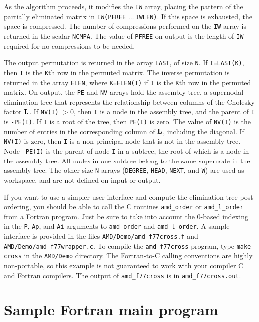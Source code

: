 \documentclass[11pt]{article}
\newcommand{\m}[1]{{\bf{#1}}}       %
\begin{document}
As the algorithm proceeds, it modifies the {\tt IW} array, placing the
pattern of the partially eliminated matrix in
{\tt IW(PFREE} $\ldots \:${\tt IWLEN)}.
If this space is exhausted, the space is compressed.
The number of compressions performed on the {\tt IW} array is
returned in the scalar {\tt NCMPA}.  The value of {\tt PFREE} on output is the
length of {\tt IW} required for no compressions to be needed.

The output permutation is returned in the array {\tt LAST}, of size {\tt N}.
If {\tt I=LAST(K)}, then {\tt I} is the {\tt K}th row in the permuted
matrix.  The inverse permutation is returned in the array {\tt ELEN}, where
{\tt K=ELEN(I)} if {\tt I} is the {\tt K}th row in the permuted matrix.
On output, the {\tt PE} and {\tt NV} arrays hold the assembly tree,
a supernodal elimination tree that represents the relationship between
columns of the Cholesky factor $\m{L}$.
If {\tt NV(I)} $> 0$, then {\tt I} is a node in the assembly
tree, and the parent of {\tt I} is {\tt -PE(I)}.  If {\tt I} is a root of
the tree, then {\tt PE(I)} is zero.  The value of {\tt NV(I)} is the
number of entries in the corresponding column of $\m{L}$, including the
diagonal.
If {\tt NV(I)} is zero, then {\tt I} is a non-principal node that is
not in the assembly tree.  Node {\tt -PE(I)} is the parent of node {\tt I}
in a subtree, the root of which is a node in the assembly tree.  All nodes
in one subtree belong to the same supernode in the assembly tree.
The other size {\tt N} arrays
({\tt DEGREE}, {\tt HEAD}, {\tt NEXT}, and {\tt W}) are used as workspace,
and are not defined on input or output.

If you want to use a simpler user-interface and compute the elimination
tree post-ordering, you should be able to call the C routines {\tt amd\_order}
or {\tt amd\_l\_order} from a Fortran program.   Just be sure to take into
account the 0-based indexing in the {\tt P}, {\tt Ap}, and {\tt Ai} arguments
to {\tt amd\_order} and {\tt amd\_l\_order}.  A sample interface is provided
in the files {\tt AMD/Demo/amd\_f77cross.f} and
{\tt AMD/Demo/amd\_f77wrapper.c}.  To compile the {\tt amd\_f77cross} program,
type {\tt make cross} in the {\tt AMD/Demo} directory.  The
Fortran-to-C calling conventions are highly non-portable, so this example
is not guaranteed to work with your compiler C and Fortran compilers.
The output of {\tt amd\_f77cross} is in {\tt amd\_f77cross.out}.

\section{Sample Fortran main program}
\end{document}
